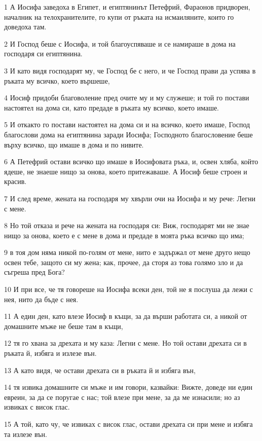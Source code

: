 \par 1 А Иосифа заведоха в Египет, и египтянинът Петефрий, Фараонов придворен, началник на телохранителите, го купи от ръката на исмаиляните, които го доведоха там.
\par 2 И Господ беше с Иосифа, и той благоуспяваше и се намираше в дома на господаря си египтянина.
\par 3 И като видя господарят му, че Господ бе с него, и че Господ прави да успява в ръката му всичко, което вършеше,
\par 4 Иосиф придоби благоволение пред очите му и му служеше; и той го постави настоятел на дома си, като предаде в ръката му всичко, което имаше.
\par 5 И откакто го постави настоятел на дома си и на всичко, което имаше, Господ благослови дома на египтянина заради Иосифа; Господното благословение беше върху всичко, що имаше в дома и по нивите.
\par 6 А Петефрий остави всичко що имаше в Иосифовата ръка, и, освен хляба, който ядеше, не знаеше нищо за онова, което притежаваше. А Иосиф беше строен и красив.
\par 7 И след време, жената на господаря му хвърли очи на Иосифа и му рече: Легни с мене.
\par 8 Но той отказа и рече на жената на господаря си: Виж, господарят ми не знае нищо за онова, което е с мене в дома и предаде в моята ръка всичко що има;
\par 9 в тоя дом няма никой по-голям от мене, нито е задържал от мене друго нещо освен тебе, защото си му жена; как, прочее, да сторя аз това голямо зло и да съгреша пред Бога?
\par 10 И при все, че тя говореше на Иосифа всеки ден, той не я послуша да лежи с нея, нито да бъде с нея.
\par 11 А един ден, като влезе Иосиф в къщи, за да върши работата си, а никой от домашните мъже не беше там в къщи,
\par 12 тя го хвана за дрехата и му каза: Легни с мене. Но той остави дрехата си в ръката й, избяга и излезе вън.
\par 13 А като видя, че остави дрехата си в ръката й и избяга вън,
\par 14 тя извика домашните си мъже и им говори, казвайки: Вижте, доведе ни един евреин, за да се поругае с нас; той влезе при мене, за да ме изнасили; но аз извиках с висок глас.
\par 15 А той, като чу, че извиках с висок глас, остави дрехата си при мене и избяга та излезе вън.
